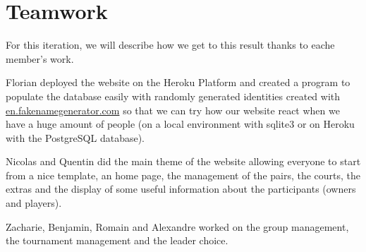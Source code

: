 \section{Teamwork}


For this iteration, we will describe how we get to this result thanks to
eache member's work. \newline

Florian deployed the website on the Heroku Platform and created a program
to populate the database easily with randomly generated identities created
with \url{en.fakenamegenerator.com} so that we can try how our website react
when we have a huge amount of people (on a local environment with sqlite3
or on Heroku with the PostgreSQL database). \newline

Nicolas and Quentin did the main theme of the website allowing everyone to
start from a nice template, an home page, the management of the pairs, the
courts, the extras and the display of some useful information about the
participants (owners and players). \newline

Zacharie, Benjamin, Romain and Alexandre worked on the group management,
the tournament management and the leader choice. \newline

